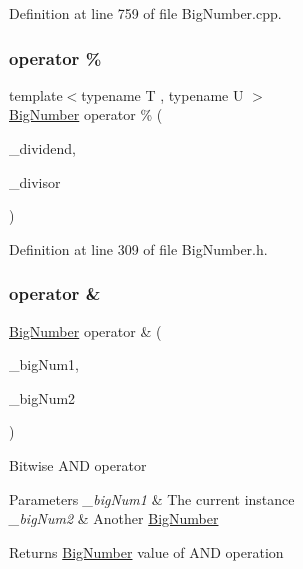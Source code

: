 Definition at line 759 of file Big\+Number.\+cpp.

\mbox{\label{class_big_nums_1_1_big_number_a17162af4b3ce281f1ac33820450986cd}} 
\subsubsection{\texorpdfstring{operator \%}{operator \%}\hspace{0.1cm}{\footnotesize\ttfamily [2/2]}}
{\footnotesize\ttfamily template$<$typename T , typename U $>$ \\
\mbox{\hyperlink{class_big_nums_1_1_big_number}{Big\+Number}} operator \% (\begin{DoxyParamCaption}\item[{const T \&}]{\+\_\+dividend,  }\item[{const U \&}]{\+\_\+divisor }\end{DoxyParamCaption})\hspace{0.3cm}{\ttfamily [friend]}}



Definition at line 309 of file Big\+Number.\+h.

\mbox{\label{class_big_nums_1_1_big_number_a177683ba51aeb898d01c71f978e7b437}} 
\subsubsection{\texorpdfstring{operator \&}{operator \&}}
{\footnotesize\ttfamily \mbox{\hyperlink{class_big_nums_1_1_big_number}{Big\+Number}} operator \& (\begin{DoxyParamCaption}\item[{const \mbox{\hyperlink{class_big_nums_1_1_big_number}{Big\+Number}} \&}]{\+\_\+big\+Num1,  }\item[{const \mbox{\hyperlink{class_big_nums_1_1_big_number}{Big\+Number}} \&}]{\+\_\+big\+Num2 }\end{DoxyParamCaption})\hspace{0.3cm}{\ttfamily [friend]}}

Bitwise A\+ND operator 
\begin{DoxyParams}{Parameters}
{\em \+\_\+big\+Num1} & The current instance \\
\hline
{\em \+\_\+big\+Num2} & Another \mbox{\hyperlink{class_big_nums_1_1_big_number}{Big\+Number}} \\
\hline
\end{DoxyParams}
\begin{DoxyReturn}{Returns}
\mbox{\hyperlink{class_big_nums_1_1_big_number}{Big\+Number}} value of A\+ND operation 
\end{DoxyReturn}



